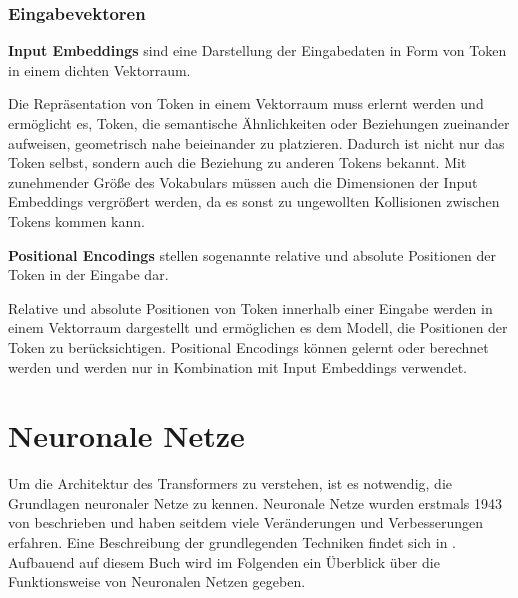 \subsubsection{Eingabevektoren}

\begin{definition}\label{def:input-embeddings}
    \textbf{Input Embeddings} sind eine Darstellung der Eingabedaten in Form von Token in einem dichten Vektorraum.
\end{definition}
Die Repräsentation von Token in einem Vektorraum muss erlernt werden und ermöglicht es,
Token, die semantische Ähnlichkeiten oder Beziehungen zueinander aufweisen, geometrisch nahe beieinander zu platzieren.
Dadurch ist nicht nur das Token selbst, sondern auch die Beziehung zu anderen Tokens bekannt. Mit zunehmender Größe des Vokabulars müssen auch die Dimensionen der Input Embeddings vergrößert werden, da es sonst zu ungewollten Kollisionen zwischen Tokens kommen kann.

\begin{definition}\label{def:positional-encodings}
    \textbf{Positional Encodings} stellen sogenannte relative und absolute Positionen der Token in der Eingabe dar.
\end{definition}
Relative und absolute Positionen von Token innerhalb einer Eingabe werden in einem Vektorraum dargestellt und ermöglichen es dem Modell, die Positionen der Token zu berücksichtigen.
Positional Encodings können gelernt oder berechnet werden und werden nur in Kombination mit Input Embeddings verwendet.

\section{Neuronale Netze}\label{sec:neuronale-netze}
Um die Architektur des Transformers zu verstehen, ist es notwendig, die Grundlagen neuronaler Netze zu kennen.
Neuronale Netze wurden erstmals 1943 von \citet{neuronal_networks_first} beschrieben und haben seitdem viele Veränderungen und Verbesserungen erfahren.
Eine Beschreibung der grundlegenden Techniken findet sich in \citet{neuronale-netze}.
Aufbauend auf diesem Buch wird im Folgenden ein Überblick über die Funktionsweise von Neuronalen Netzen gegeben.\\

